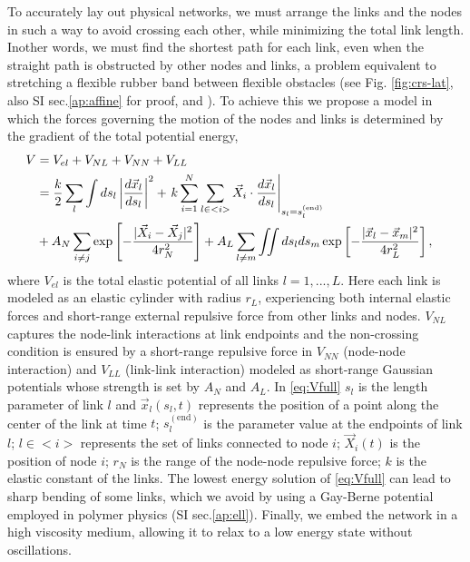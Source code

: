 \documentclass[nofootinbib,preprint,floatfix,titlepage,endfloats,superscriptaddress]{revtex4} %
\begin{document}
To accurately lay out physical networks, we must arrange the links and the nodes in such a way to avoid crossing each other, while minimizing the total link length. 
Inother words, we must find the shortest path for each link, even when the straight path is obstructed by other nodes and links, a problem equivalent to stretching a flexible rubber band between flexible obstacles (see Fig. \ref{fig:crs-lat}, also SI sec.\ref{ap:affine} for proof, and \cite{novikov1984}). 
To achieve this we propose a model in which the forces governing the motion of the nodes and links is determined by the gradient of the total potential energy,  
\begin{align}
    V &= V_{el} + V_{NL} +V_{NN} + V_{LL} \cr 
    &= {k\over 2}\sum_l\int ds_l \left|{d\vec{x}_l\over ds_l} \right|^2 + 
    \left. k\sum_{i=1}^N  \sum_{l\in <i>}  \vec{X}_i \cdot{d\vec{x}_l%
    \over ds_l}\right|_{s_l = s_l^{(\mathrm{end})}}
    \cr
    &+ A_N\sum_{i\ne j}  \exp\left[- {|\vec{X}_i-\vec{X}_j|^2 \over 4r_N^2}\right]+A_L\sum_{l\ne m} \iint ds_lds_m 
    \exp\left[- {|\vec{x}_l-\vec{x}_m|^2 \over 4 r_L^2}\right] ,
 \label{eq:Vfull}
\end{align}
where $V_{el}$ is the total elastic potential of all links $l=1,...,L$. 
Here each link is modeled as an elastic cylinder with radius $r_L$, experiencing both internal elastic forces and short-range external repulsive force from other links and nodes. $V_{NL}$ captures the node-link interactions at link endpoints and 
the non-crossing condition is ensured by a short-range repulsive force in
$V_{NN}$  (node-node interaction)  and  $V_{LL}$ (link-link interaction) modeled as short-range Gaussian potentials whose strength is set by $A_N$ and $A_L$. 
In \eqref{eq:Vfull} $s_l$ is the length parameter of link $l$ and  $\vec{x}_l(s_l,t)$ represents the position of a point along the center of the link at time $t$;
$s_l^\mathrm{(end)}$ is the parameter value at the endpoints of link $l$;
$l\in <i>$ represents the set of links connected to node $i$; 
$\vec{X}_i(t)$ is the position of node $i$; $r_N$ is the range of the node-node repulsive force; $k$ is the elastic constant of the links.
The lowest energy solution of \eqref{eq:Vfull} can lead to sharp bending of some links, which we avoid by using a Gay-Berne potential  \cite{gay1981modification,berne1972gaussian} employed in polymer physics \citep{everaers2003interaction,babadi2006coarse,mergell2003modeling,cleaver1996extension} (SI sec.\ref{ap:ell}). 
Finally, we embed the network in a high viscosity medium, allowing it to relax to a low energy state without oscillations.
\end{document}

